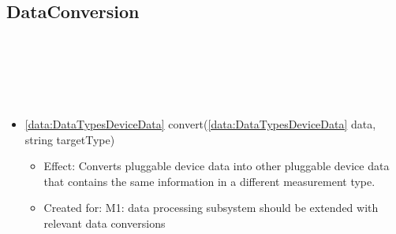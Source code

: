   \subsection{DataConversion}\label{int:OnlineServiceOnlineServiceApplicationManagerDeviceDataConverterDataConversion}
    \begin{description}
      \item[Provided by:] \iconcomponent{}~
      \item[Required by:] \iconcomponent{}~
      \item[Operations:] ~
    \begin{itemize}[noitemsep,nolistsep,leftmargin=-.25cm]
      \item \textsf{\ref{data:DataTypesDeviceData} convert(\ref{data:DataTypesDeviceData} data, string targetType)}
        \begin{itemize}[noitemsep,nolistsep]
           \item Effect: Converts pluggable device data into other pluggable device data that contains the same information in a different measurement type.
\item Created for: M1: data processing subsystem should be extended with relevant data conversions
        \end{itemize}
    \end{itemize}
    \end{description}

